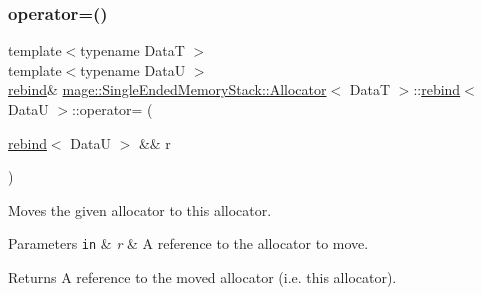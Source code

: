 \subsubsection{\texorpdfstring{operator=()}{operator=()}\hspace{0.1cm}{\footnotesize\ttfamily [2/2]}}
{\footnotesize\ttfamily template$<$typename DataT $>$ \\
template$<$typename DataU $>$ \\
\hyperlink{structmage_1_1_single_ended_memory_stack_1_1_allocator_1_1rebind}{rebind}\& \hyperlink{structmage_1_1_single_ended_memory_stack_1_1_allocator}{mage\+::\+Single\+Ended\+Memory\+Stack\+::\+Allocator}$<$ DataT $>$\+::\hyperlink{structmage_1_1_single_ended_memory_stack_1_1_allocator_1_1rebind}{rebind}$<$ DataU $>$\+::operator= (\begin{DoxyParamCaption}\item[{\hyperlink{structmage_1_1_single_ended_memory_stack_1_1_allocator_1_1rebind}{rebind}$<$ DataU $>$ \&\&}]{r }\end{DoxyParamCaption})\hspace{0.3cm}{\ttfamily [delete]}}

Moves the given allocator to this allocator.


\begin{DoxyParams}[1]{Parameters}
\mbox{\tt in}  & {\em r} & A reference to the allocator to move. \\
\hline
\end{DoxyParams}
\begin{DoxyReturn}{Returns}
A reference to the moved allocator (i.\+e. this allocator). 
\end{DoxyReturn}
